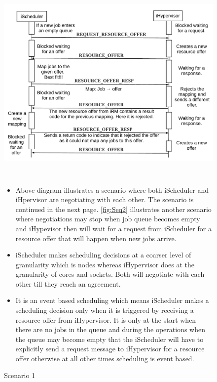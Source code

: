 \begin{figure}[!htbp]
\centering
\includegraphics[width=1.0\textwidth, height=100mm]{./figures/figures.pdf}
\caption{Scenario 1}
\begin{itemize}
\item Above diagram illustrates a scenario where both iScheduler and iHpervisor are negotiating with each other. The scenario is continued in the next page. \ref{fig:Seq2} illustrates another scenario where negotiations may stop when job queue becomes empty and iHypevisor then will wait for a request from iScheduler for a resource offer that will happen when new jobs arrive.
\item iScheduler makes scheduling decisions at a coarser level of granularity which is nodes whereas iHypervisor does at the granularity of cores and sockets. Both will negotiate with each other till they reach an agreement.
\item It is an event based scheduling which means iScheduler makes a scheduling decision only when it is triggered by receiving a resource offer from iHypervisor. It is only at the start when there are no jobs in the queue and during the operations when the queue may become empty that the iScheduler will have to explicitly send a request message to iHypervisor for a resource offer otherwise at all other times scheduling is event based.
\end{itemize}
\label{fig:Seq1}
\end{figure}
\vspace{-0.25in}
